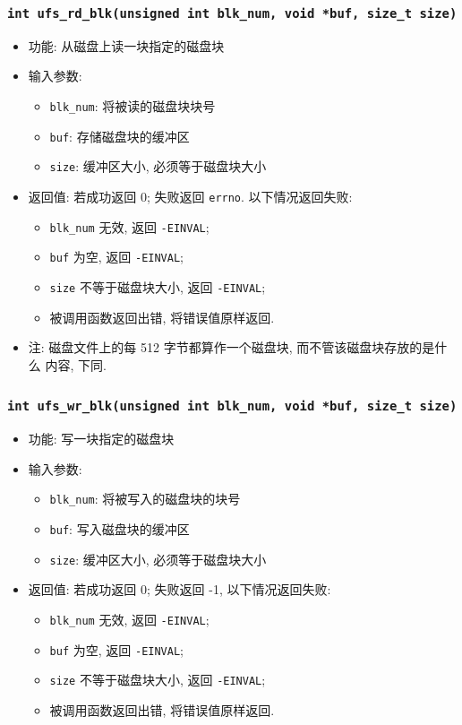 \documentclass[nofonts]{ctexart}
\begin{document}
  \subsubsection{\texttt{int ufs\_rd\_blk(unsigned int blk\_num, void *buf, size\_t size)}}
  \begin{itemize}
\item
  功能: 从磁盘上读一块指定的磁盘块
\item
  输入参数:

  \begin{itemize}
  \item
    \texttt{blk\_num}: 将被读的磁盘块块号
  \item
    \texttt{buf}: 存储磁盘块的缓冲区
  \item
    \texttt{size}: 缓冲区大小, 必须等于磁盘块大小
  \end{itemize}
\item
  返回值: 若成功返回 0; 失败返回 \texttt{errno}. 以下情况返回失败:

  \begin{itemize}
  \item
    \texttt{blk\_num} 无效, 返回 \texttt{-EINVAL};
  \item
    \texttt{buf} 为空, 返回 \texttt{-EINVAL};
  \item
    \texttt{size} 不等于磁盘块大小, 返回 \texttt{-EINVAL};
  \item
    被调用函数返回出错, 将错误值原样返回.
  \end{itemize}
\item
  注: 磁盘文件上的每 512 字节都算作一个磁盘块,
  而不管该磁盘块存放的是什么 内容, 下同.
  \end{itemize}
  \subsubsection{\texttt{int ufs\_wr\_blk(unsigned int blk\_num, void *buf, size\_t size)}}
  \begin{itemize}
\item
  功能: 写一块指定的磁盘块
\item
  输入参数:

  \begin{itemize}
  \item
    \texttt{blk\_num}: 将被写入的磁盘块的块号
  \item
    \texttt{buf}: 写入磁盘块的缓冲区
  \item
    \texttt{size}: 缓冲区大小, 必须等于磁盘块大小
  \end{itemize}
\item
  返回值: 若成功返回 0; 失败返回 -1, 以下情况返回失败:

  \begin{itemize}
  \item
    \texttt{blk\_num} 无效, 返回 \texttt{-EINVAL};
  \item
    \texttt{buf} 为空, 返回 \texttt{-EINVAL};
  \item
    \texttt{size} 不等于磁盘块大小, 返回 \texttt{-EINVAL};
  \item
    被调用函数返回出错, 将错误值原样返回.
  \end{itemize}
  \end{itemize}
\end{document}

